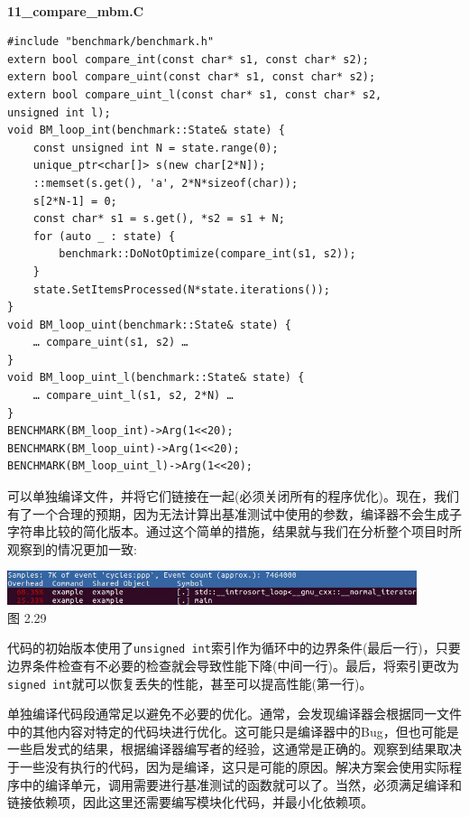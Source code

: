 \hspace*{\fill} \\ %
\noindent
\textbf{11\_compare\_mbm.C}
\begin{lstlisting}[style=styleCXX]
#include "benchmark/benchmark.h"
extern bool compare_int(const char* s1, const char* s2);
extern bool compare_uint(const char* s1, const char* s2);
extern bool compare_uint_l(const char* s1, const char* s2,
unsigned int l);
void BM_loop_int(benchmark::State& state) {
	const unsigned int N = state.range(0);
	unique_ptr<char[]> s(new char[2*N]);
	::memset(s.get(), 'a', 2*N*sizeof(char));
	s[2*N-1] = 0;
	const char* s1 = s.get(), *s2 = s1 + N;
	for (auto _ : state) {
		benchmark::DoNotOptimize(compare_int(s1, s2));
	}
	state.SetItemsProcessed(N*state.iterations());
}
void BM_loop_uint(benchmark::State& state) {
	… compare_uint(s1, s2) …
}
void BM_loop_uint_l(benchmark::State& state) {
	… compare_uint_l(s1, s2, 2*N) …
}
BENCHMARK(BM_loop_int)->Arg(1<<20);
BENCHMARK(BM_loop_uint)->Arg(1<<20);
BENCHMARK(BM_loop_uint_l)->Arg(1<<20);
\end{lstlisting}

可以单独编译文件，并将它们链接在一起(必须关闭所有的程序优化)。现在，我们有了一个合理的预期，因为无法计算出基准测试中使用的参数，编译器不会生成子字符串比较的简化版本。通过这个简单的措施，结果就与我们在分析整个项目时所观察到的情况更加一致:

\begin{center}
\includegraphics[width=0.9\textwidth]{content/1/chapter2/images/29.jpg}\\
图 2.29
\end{center}

代码的初始版本使用了\texttt{unsigned int}索引作为循环中的边界条件(最后一行)，只要边界条件检查有不必要的检查就会导致性能下降(中间一行)。最后，将索引更改为\texttt{signed int}就可以恢复丢失的性能，甚至可以提高性能(第一行)。

单独编译代码段通常足以避免不必要的优化。通常，会发现编译器会根据同一文件中的其他内容对特定的代码块进行优化。这可能只是编译器中的Bug，但也可能是一些启发式的结果，根据编译器编写者的经验，这通常是正确的。观察到结果取决于一些没有执行的代码，因为是编译，这只是可能的原因。解决方案会使用实际程序中的编译单元，调用需要进行基准测试的函数就可以了。当然，必须满足编译和链接依赖项，因此这里还需要编写模块化代码，并最小化依赖项。

